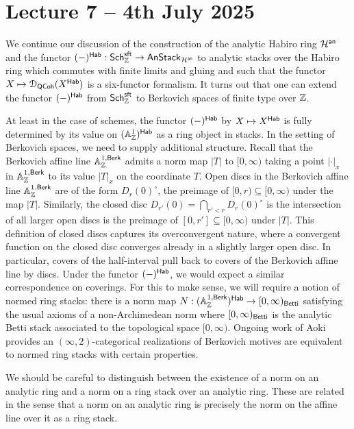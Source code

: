 \section{Lecture 7 -- 4th July 2025}\label{sec: lecture 7}
We continue our discussion of the construction of the analytic Habiro ring $\mathcal{H}^{\mathsf{an}}$ and the functor $(-)^{\mathsf{Hab}}:\mathsf{Sch}_{\mathbb{Z}}^{\mathsf{sft}}\to\mathsf{AnStack}_{\mathcal{H}^{\mathsf{an}}}$ to analytic stacks over the Habiro ring which commutes with finite limits and gluing and such that the functor $X\mapsto\EuScript{D}_{\mathsf{QCoh}}(X^{\mathsf{Hab}})$ is a six-functor formalism. It turns out that one can extend the functor $(-)^{\mathsf{Hab}}$ from $\mathsf{Sch}^{\mathsf{sft}}_{\mathbb{Z}}$ to Berkovich spaces of finite type over $\mathbb{Z}$. 

At least in the case of schemes, the functor $(-)^{\mathsf{Hab}}$ by $X\mapsto X^{\mathsf{Hab}}$ is fully determined by its value on $(\mathbb{A}^{1}_{\mathbb{Z}})^{\mathsf{Hab}}$ as a ring object in stacks. In the setting of Berkovich spaces, we need to supply additional structure. Recall that the Berkovich affine line $\mathbb{A}^{1,\mathsf{Berk}}_{\mathbb{Z}}$ admits a norm map $|T|$ to $[0,\infty)$ taking a point $|\cdot|_{x}$ in $\mathbb{A}^{1,\mathsf{Berk}}_{\mathbb{Z}}$ to its value $|T|_{x}$ on the coordinate $T$. Open discs in the Berkovich affine line $\mathbb{A}^{1,\mathsf{Berk}}_{\mathbb{Z}}$ are of the form $D_{r}(0)^{\circ}$, the preimage of $[0,r)\subseteq[0,\infty)$ under the map $|T|$. Similarly, the closed disc $D_{r'}(0)=\bigcap_{r'<r}D_{r}(0)^{\circ}$ is the intersection of all larger open discs is the preimage of $[0,r']\subseteq[0,\infty)$ under $|T|$. This definition of closed discs captures its overconvergent nature, where a convergent function on the closed disc converges already in a slightly larger open disc. In particular, covers of the half-interval pull back to covers of the Berkovich affine line by discs. Under the functor $(-)^{\mathsf{Hab}}$, we would expect a similar correspondence on coverings. For this to make sense, we will require a notion of normed ring stacks: there is a norm map $N:(\mathbb{A}^{1,\mathsf{Berk}}_{\mathbb{Z}})^{\mathsf{Hab}}\to[0,\infty)_{\mathsf{Betti}}$ satisfying the usual axioms of a non-Archimedean norm where $[0,\infty)_{\mathsf{Betti}}$ is the analytic Betti stack associated to the topological space $[0,\infty)$. Ongoing work of Aoki provides an $(\infty,2)$-categorical realizations of Berkovich motives are equivalent to normed ring stacks with certain properties. 
\begin{remark}
    We should be careful to distinguish between the existence of a norm on an analytic ring and a norm on a ring stack over an analytic ring. These are related in the sense that a norm on an analytic ring is precisely the norm on the affine line over it as a ring stack. 
\end{remark}
